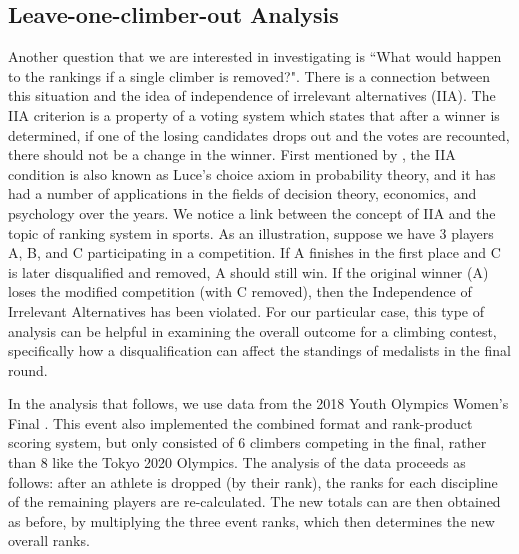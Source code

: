 \documentclass[letterpaper, inpress]{jds} %
\begin{document}
\subsection{Leave-one-climber-out
Analysis}
\label{leave-one-climber-out-analysis}

Another question that we are interested in investigating is ``What would happen to the rankings if a single climber is removed?". There is a connection between this situation and the idea of independence of irrelevant alternatives (IIA). The IIA criterion is a property of a voting system which states that after a winner is determined, if one of the losing candidates drops out and the votes are recounted, there should not be a change in the winner. First mentioned by \citep{arrow1951}, the IIA condition is also known as Luce's choice axiom \citep{luce1959} in probability theory, and it has had a number of applications in the fields of decision theory, economics, and psychology over the years. We notice a link between the concept of IIA and the topic of ranking system in sports. As an illustration, suppose we have 3 players A, B, and C participating in a competition. If A finishes in the first place and C is later disqualified and removed, A should still win. If the original winner (A) loses the modified competition (with C removed), then the Independence of Irrelevant Alternatives has been violated. For our particular case, this type of analysis can be helpful in examining the overall outcome for a climbing contest, specifically how a disqualification can affect the standings of medalists in the final round.

In the analysis that follows, we use data from the 2018 Youth Olympics Women's Final \citep{2018youth}. This event also implemented the combined format and rank-product scoring system, but only consisted of 6 climbers competing in the final, rather than 8 like the Tokyo 2020 Olympics. The analysis of the data proceeds as follows: after an athlete is dropped (by their rank), the ranks for each discipline of the remaining players are re-calculated. The new totals can are then obtained as before, by multiplying the three event ranks, which then determines the new overall ranks.
\end{document}
